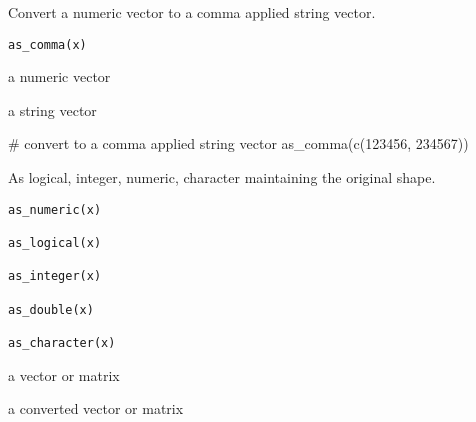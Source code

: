 \documentclass[letterpaper]{book}
\begin{document}
%
\begin{Description}
Convert a numeric vector to a comma applied string vector.
\end{Description}
%
\begin{Usage}
\begin{verbatim}
as_comma(x)
\end{verbatim}
\end{Usage}
%
\begin{Arguments}
\begin{ldescription}
\item[\code{x}] a numeric vector
\end{ldescription}
\end{Arguments}
%
\begin{Value}
a string vector
\end{Value}
%
\begin{Examples}
\begin{ExampleCode}
# convert to a comma applied string vector
as_comma(c(123456, 234567))

\end{ExampleCode}
\end{Examples}
%
\begin{Description}
As logical, integer, numeric, character maintaining the original shape.
\end{Description}
%
\begin{Usage}
\begin{verbatim}
as_numeric(x)

as_logical(x)

as_integer(x)

as_double(x)

as_character(x)
\end{verbatim}
\end{Usage}
%
\begin{Arguments}
\begin{ldescription}
\item[\code{x}] a vector or matrix
\end{ldescription}
\end{Arguments}
%
\begin{Value}
a converted vector or matrix
\end{Value}
\end{document}
